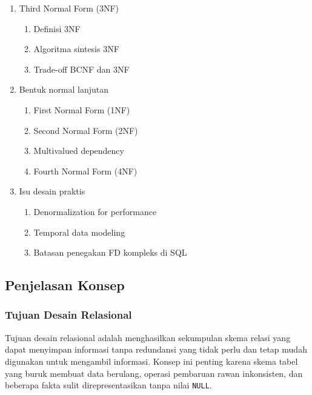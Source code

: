 \begin{enumerate}
    \begin{enumerate}
        \item \pwajib Definisi BCNF
        \item \pwajib Pengujian pelanggaran BCNF
        \item \pwajib Algoritma dekomposisi BCNF
    \end{enumerate}
    \item \pwajib Third Normal Form (3NF)
    \begin{enumerate}
        \item \pwajib Definisi 3NF
        \item \pwajib Algoritma sintesis 3NF
        \item \pwajib Trade-off BCNF dan 3NF
    \end{enumerate}
    \item \ppaham Bentuk normal lanjutan
    \begin{enumerate}
        \item \ppaham First Normal Form (1NF)
        \item \ppaham Second Normal Form (2NF)
        \item \ppaham Multivalued dependency
        \item \ppaham Fourth Normal Form (4NF)
    \end{enumerate}
    \item \ppaham Isu desain praktis
    \begin{enumerate}
        \item \ppaham Denormalization for performance
        \item \ppaham Temporal data modeling
        \item \ppaham Batasan penegakan FD kompleks di SQL
    \end{enumerate}
\end{enumerate}

\subsection{Penjelasan Konsep}

\subsubsection{Tujuan Desain Relasional}

\begin{jawab}
Tujuan desain relasional adalah menghasilkan sekumpulan skema relasi yang dapat menyimpan informasi tanpa redundansi yang tidak perlu dan tetap mudah digunakan untuk mengambil informasi. Konsep ini penting karena skema tabel yang buruk membuat data berulang, operasi pembaruan rawan inkonsisten, dan beberapa fakta sulit direpresentasikan tanpa nilai \texttt{NULL}.
\end{jawab}

